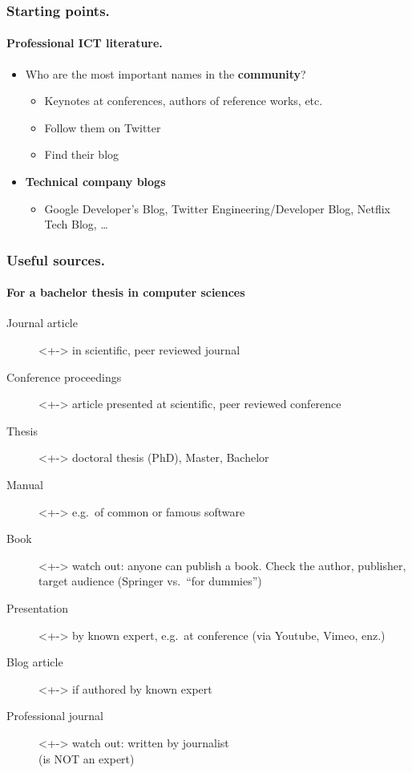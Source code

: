 \documentclass[aspectratio=169]{beamer}
\begin{document}
    \begin{frame}
        \frametitle{Starting points.}
        \framesubtitle{Professional ICT literature.}
        
        \begin{itemize}
            \item<+-> Who are the most important names in the \textbf{community}?
            \begin{itemize}
                \item Keynotes at conferences, authors of reference works, etc.
                \item Follow them on Twitter
                \item Find their blog
            \end{itemize}
            \item<+-> \textbf{Technical company blogs} 
            \begin{itemize}
                \item Google Developer's Blog, Twitter Engineering/Developer Blog, Netflix Tech Blog, \dots
            \end{itemize}
        \end{itemize}
    \end{frame}
    
    
    \begin{frame}
        \frametitle{Useful sources.}
        \framesubtitle{For a bachelor thesis in computer sciences}
        
        \begin{description}
            \item[Journal article]<+-> in scientific, peer reviewed journal
            \item[Conference proceedings]<+-> article presented at scientific, peer reviewed conference
            \item[Thesis]<+-> doctoral thesis (PhD), Master, Bachelor
            \item[Manual]<+-> e.g.\ of common or famous software
            \item[Book]<+-> watch out: anyone can publish a book. Check the author, publisher, target audience (Springer vs.\ ``for dummies'')
            \item[Presentation]<+-> by known expert, e.g.\ at conference (via Youtube, Vimeo, enz.)
            \item[Blog article]<+-> if authored by known expert
            \item[Professional journal]<+-> watch out: written by journalist \\ (is NOT an expert)
        \end{description}
    \end{frame}
    
\end{document}
